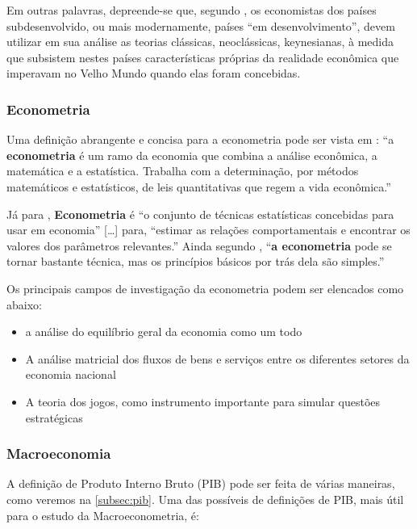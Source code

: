 \documentclass[]{article}
\providecommand{\tightlist}{%
  \setlength{\itemsep}{0pt}\setlength{\parskip}{0pt}}
\begin{document}
Em outras palavras, depreende-se que, segundo
, os economistas dos países
subdesenvolvido, ou mais modernamente, países ``em desenvolvimento'',
devem utilizar em sua análise as teorias clássicas, neoclássicas,
keynesianas, à medida que subsistem nestes países características
próprias da realidade econômica que imperavam no Velho Mundo quando elas
foram concebidas.

\subsubsection{Econometria}\label{econometria}

Uma definição abrangente e concisa para a econometria pode ser vista em
\cite[p.~36]{rossetti}: ``a \textbf{econometria} é um ramo da economia
que combina a análise econômica, a matemática e a estatística. Trabalha
com a determinação, por métodos matemáticos e estatísticos, de leis
quantitativas que regem a vida econômica.''

Já para , \textbf{Econometria} é ``o
conjunto de técnicas estatísticas concebidas para usar em economia''
\cite[p.~567]{blanchard}{[}\ldots{}{]} para, ``estimar as relações
comportamentais e encontrar os valores dos parâmetros relevantes.''
Ainda segundo , ``\textbf{a econometria}
pode se tornar bastante técnica, mas os princípios básicos por trás dela
são simples.''

Os principais campos de investigação da econometria podem ser elencados
como abaixo\cite[p.~36]{rossetti}:

\begin{itemize}
\tightlist
\item
  a análise do equilíbrio geral da economia como um todo
\item
  A análise matricial dos fluxos de bens e serviços entre os diferentes
  setores da economia nacional
\item
  A teoria dos jogos, como instrumento importante para simular questões
  estratégicas
\end{itemize}

\subsubsection{Macroeconomia}\label{macroeconomia}

A definição de Produto Interno Bruto (PIB) pode ser feita de várias
maneiras, como veremos na \autoref{subsec:pib}. Uma das possíveis de
definições de PIB, mais útil para o estudo da Macroeconometria, é:
\end{document}
